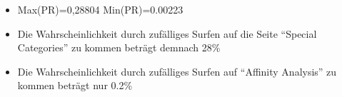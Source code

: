 \begin{frame}[c]
    \begin{itemize}
\begin{enumerate}
  \item ID(66)	PR(0,28804), Special Categories
  \item ID(64)	PR(0,22126), Wikipedia Categorization
  \item ID(107) PR(0,06453), Category Data mining
  \item ID(12)	PR(0,03134), Data mining
  \item ID(91)	PR(0,01396), Why  might a category list\ldots
  \item ID(58)	PR(0,01061), Cluster analysis
\end{enumerate}
\ldots
\begin{enumerate}[100.]
\item  ID(104)	PR(0,00223), Affinity analysis
\end{enumerate}
\item Max(PR)=0,28804 Min(PR)=0.00223
\item Die Wahrscheinlichkeit durch zufälliges Surfen auf die Seite
``Special Categories'' zu kommen beträgt demnach 28\%
\item Die Wahrscheinlichkeit durch zufälliges Surfen auf ``Affinity Analysis'' zu
kommen beträgt nur 0.2\%
\end{itemize}
\end{frame}
